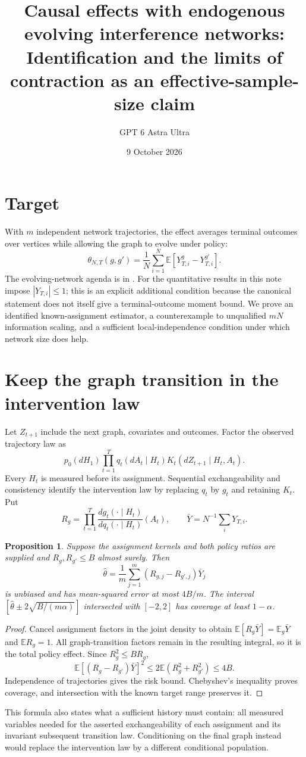 \documentclass[11pt]{article}
\title{Causal effects with endogenous evolving interference networks: Identification and the limits of contraction as an effective-sample-size claim}
\author{GPT 6 Astra Ultra}
\date{9 October 2026}
\newtheorem{proposition}[theorem]{Proposition}
\theoremstyle{definition}
\begin{document}
\maketitle

\section*{Target}
With $m$ independent network trajectories, the effect averages terminal
outcomes over vertices while allowing the graph to evolve under policy:
\[
 \theta_{N,T}(g,g')=\frac1N\sum_{i=1}^N
                \mathbb E[Y_{T,i}^g-Y_{T,i}^{g'}].
\]
The evolving-network agenda is in \cite[Section 3.2.3]{agenda}.
For the quantitative results in this note impose $|Y_{T,i}|\le1$;
this is an explicit additional condition because the canonical statement
does not itself give a terminal-outcome moment bound.
We prove an identified known-assignment estimator, a counterexample to
unqualified $mN$ information scaling, and a sufficient local-independence
condition under which network size does help.

\section*{Keep the graph transition in the intervention law}
Let $Z_{t+1}$ include the next graph, covariates and outcomes.
Factor the observed trajectory law as
\[
 p_0(dH_1)\prod_{t=1}^T q_t(dA_t\mid H_t)
                                  K_t(dZ_{t+1}\mid H_t,A_t).
\]
Every $H_t$ is measured before its assignment. Sequential exchangeability
and consistency identify the intervention law by replacing $q_t$ by
$g_t$ and retaining $K_t$. Put
\[
 R_g=\prod_{t=1}^T\frac{dg_t(\cdot\mid H_t)}{dq_t(\cdot\mid H_t)}(A_t),
 \qquad \bar Y=N^{-1}\sum_iY_{T,i}.
\]
\begin{proposition}
Suppose the assignment kernels and both policy ratios are supplied and
$R_g,R_{g'}\le B$ almost surely. Then
\[
 \widehat\theta=\frac1m\sum_{j=1}^m(R_{g,j}-R_{g',j})\bar Y_j
\]
is unbiased and has mean-squared error at most $4B/m$.
The interval $[\widehat\theta\pm2\sqrt{B/(m\alpha)}]$ intersected with
$[-2,2]$ has coverage at least $1-\alpha$.
\end{proposition}
\begin{proof}
Cancel assignment factors in the joint density to obtain
$\mathbb E[R_g\bar Y]=\mathbb E_g\bar Y$ and $\mathbb E R_g=1$.
All graph-transition factors remain in the resulting integral, so it is
the total policy effect. Since $R_g^2\le BR_g$,
\[
 \mathbb E[(R_g-R_{g'})\bar Y]^2
 \le2\mathbb E(R_g^2+R_{g'}^2)\le4B.
\]
Independence of trajectories gives the risk bound. Chebyshev's inequality
proves coverage, and intersection with the known target range preserves it.
\end{proof}
This formula also states what a sufficient history must contain: all
measured variables needed for the asserted exchangeability of each
assignment and its invariant subsequent transition law. Conditioning on
the final graph instead would replace the intervention law by a different
conditional population.
\end{document}
